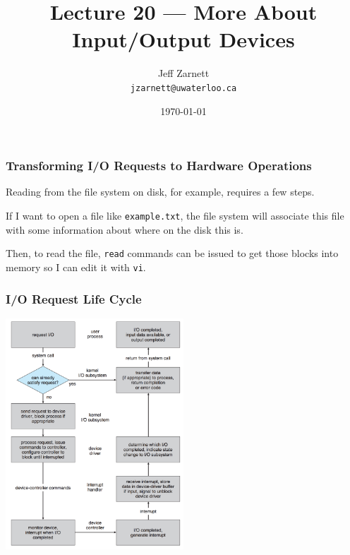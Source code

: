 

\title{Lecture 20 ---  More About Input/Output Devices }

\author{Jeff Zarnett \\ \small \texttt{jzarnett@uwaterloo.ca}}
\date{\today}




\begin{frame}
  \titlepage

 \end{frame}
 
\begin{frame}
\frametitle{Transforming I/O Requests to Hardware Operations}

Reading from the file system on disk, for example, requires a few steps. 

If I want to open a file like \texttt{example.txt}, the file system will associate this file with some information about where on the disk this is. 

Then, to read the file, \texttt{read} commands can be issued to get those blocks into memory so I can edit it with \texttt{vi}.

\end{frame}

\begin{frame}
\frametitle{I/O Request Life Cycle}

\begin{center}
	\includegraphics[width=0.5\textwidth]{images/io-lifecycle.png}
\end{center}

\end{frame}


